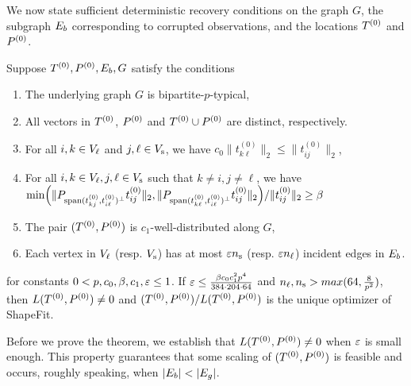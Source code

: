 We now state sufficient deterministic recovery conditions on the graph $G$, the subgraph $E_b$ corresponding to corrupted observations, and the locations $T^{(0)}$ and $P^{(0)}$.

\begin{theorem} \label{thm:mainthm}
Suppose $T^{(0)}, P^{(0)}, E_b, G$ satisfy the conditions
\begin{enumerate}
  \setlength{\itemsep}{1pt} \setlength{\parskip}{0pt}
  \setlength{\parsep}{0pt}
	\item The underlying graph $G$ is bipartite-$p$-typical,
	\item All vectors in $T^{(0)}$, $P^{(0)}$ and $T^{(0)} \cup P^{(0)}$ are distinct, respectively.
	\item For all $i,k \in V_\ell$ and $j, \ell \in V_\text{s}$, we have $c_{0}\|t_{k\ell}^{(0)}\|_2\le\|t_{ij}^{(0)}\|_2$,
	\item For all $i,k \in V_\ell, j,\ell \in V_\text{s}$ such that $k \neq i, j \neq \ell$, we have \\
	$\min \Bigl(\|P_{\operatorname{span} (t^{{(0)}}_{kj},t^{{(0)}}_{i\ell})^{\perp}} t^{{(0)}}_{ij} \|_2, 
	 \|P_{\operatorname{span} (t^{{(0)}}_{k\ell},t^{{(0)}}_{i\ell})^{\perp}} t^{{(0)}}_{ij} \|_2 \Bigr) / \|t^{{(0)}}_{ij} \|_2 \geq \beta$
	\item The pair $(T^{(0)}, P^{(0)})$ is $c_{1}$-well-distributed
along $G$,
	\item Each vertex in $V_\ell$ (resp.  $V_\text{s}$) has at most $\varepsilon n_\text{s}$ (resp.  $\varepsilon n_\ell$) incident edges in $E_b$.
\end{enumerate}
for constants $0< p, c_0, \beta,  c_{1}, \varepsilon \leq 1$.  If $\varepsilon \leq \frac{\beta c_0 c_1^2 p^4}{384\cdot204\cdot64}$ and $n_\ell, n_\text{s} > max(64, \frac{8}{p^2})$, then $L(T^{(0)}, P^{(0)})\neq 0$ and $(T^{(0)}, P^{(0)}) / L(T^{(0)}, P^{(0)})$ is the unique optimizer of ShapeFit.
\end{theorem}

Before we prove the theorem, we establish that $L(T^{(0)}, P^{(0)})\neq 0$ when $\varepsilon$ is small enough.  This property guarantees that some scaling of $(T^{(0)},P^{(0)})$ is feasible and occurs, roughly speaking, when $|E_b| < |E_g|$.



